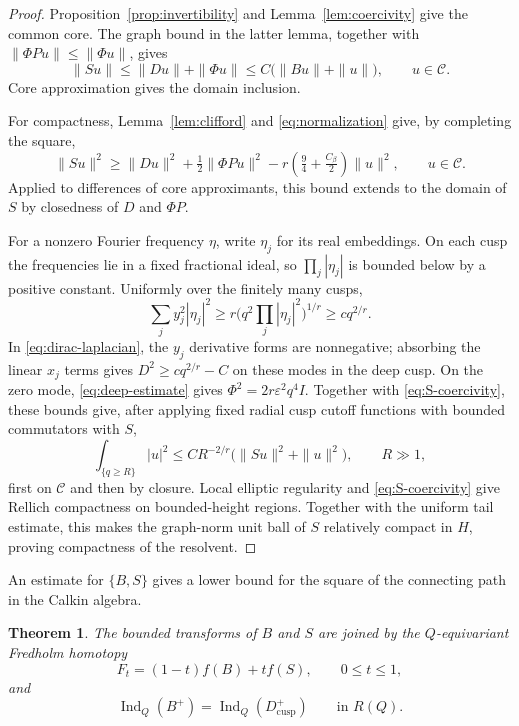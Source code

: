 \documentclass[11pt]{article}
\theoremstyle{definition}
\theoremstyle{plain}
\numberwithin{equation}{section}
\newtheorem{theorem}{Theorem}[section]
\newcommand{\cusp}{\mathrm{cusp}}
\newcommand{\Ind}{\operatorname{Ind}}
\begin{document}
\begin{proof}
Proposition~\ref{prop:invertibility} and Lemma~\ref{lem:coercivity}
give the common core. The graph bound in the latter lemma, together
with $\|\Phi Pu\|\leq\|\Phi u\|$, gives
\[
 \|Su\|\leq\|Du\|+\|\Phi u\|
       \leq C\bigl(\|Bu\|+\|u\|\bigr),\qquad u\in\mathcal C.
\]
Core approximation gives the domain inclusion.

For compactness, Lemma~\ref{lem:clifford} and
\eqref{eq:normalization} give, by completing the square,
\begin{equation}\label{eq:S-coercivity}
 \|Su\|^2
 \geq\|Du\|^2+\tfrac12\|\Phi Pu\|^2
       -r\left(\tfrac94+\tfrac{C_\beta}{2}\right)\|u\|^2,
 \qquad u\in\mathcal C.
\end{equation}
Applied to differences of core approximants, this bound extends
to the domain of $S$ by closedness of $D$ and $\Phi P$.

For a nonzero Fourier frequency $\eta$, write $\eta_j$ for its
real embeddings. On each cusp the frequencies lie in a fixed
fractional ideal, so $\prod_j|\eta_j|$ is bounded below by a
positive constant. Uniformly over the finitely many cusps,
\[
 \sum_jy_j^2|\eta_j|^2
 \geq r\bigl(q^2\prod_j|\eta_j|^2\bigr)^{1/r}
 \geq c q^{2/r}.
\]
In \eqref{eq:dirac-laplacian}, the $y_j$ derivative forms are
nonnegative; absorbing the linear $x_j$ terms gives
$D^2\geq cq^{2/r}-C$ on these modes in the deep cusp.
On the zero mode, \eqref{eq:deep-estimate}
gives $\Phi^2=2r\varepsilon^2q^4I$.
Together with \eqref{eq:S-coercivity}, these bounds give, after applying fixed
radial cusp cutoff functions with bounded commutators with $S$,
\[
 \int_{\{q\geq R\}}|u|^2
 \leq CR^{-2/r}\bigl(\|Su\|^2+\|u\|^2\bigr),\qquad R\gg1,
\]
first on $\mathcal C$ and then by closure.
Local elliptic regularity and \eqref{eq:S-coercivity} give
Rellich compactness on bounded-height regions. Together with
the uniform tail estimate, this makes the graph-norm unit
ball of $S$ relatively compact in $H$, proving compactness
of the resolvent.
\end{proof}

An estimate for $\{B,S\}$ gives a lower bound for the square
of the connecting path in the Calkin algebra.

\begin{theorem}\label{thm:homotopy}
The bounded transforms of $B$ and $S$ are joined by the
$Q$-equivariant Fredholm homotopy
\begin{equation}\label{eq:bounded-path}
 F_t=(1-t)f(B)+tf(S),\qquad 0\leq t\leq1,
\end{equation}
and
\begin{equation}\label{eq:index-equality}
 \Ind_Q(B^+)=\Ind_Q(D_{\cusp}^+)
 \qquad\text{in }R(Q).
\end{equation}
\end{theorem}
\end{document}
